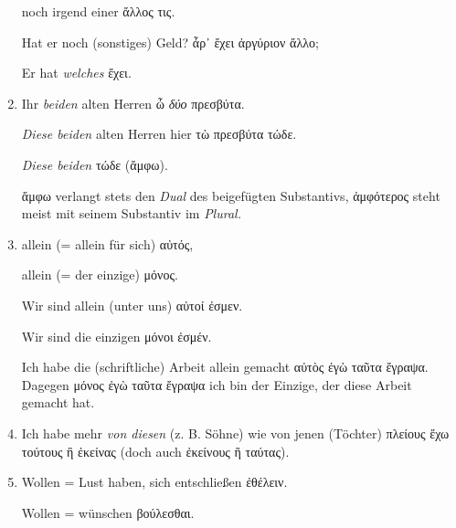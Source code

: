 \begin{enumerate}[leftmargin=0pt,rightmargin=0pt,listparindent =1cm,labelindent=1cm,labelsep=1ex,labelwidth={*},itemindent={*},align=left]
\begin{continuousitemline}
noch irgend einer \textgreek[variant=ancient]{ἄλλος τις.}


Hat er noch (sonstiges) Geld? \textgreek[variant=ancient]{ἆρ᾽ ἔχει
ἀργύριον ἄλλο;}


Er hat \emph{welches} \textgreek[variant=ancient]{ἔχει.}\par\end{continuousitemline}

\item Ihr \emph{beiden} alten Herren \textgreek[variant=ancient]{ὦ \emph{δύο}
πρεσβύτα.}


\begin{continuousitemline}\emph{Diese beiden} alten Herren hier \textgreek[variant=ancient]{τὼ
πρεσβύτα τώδε.}


\emph{Diese beiden} \textgreek[variant=ancient]{τώδε (ἄμφω).}\par\end{continuousitemline}


\textgreek[variant=ancient]{ἄμφω} verlangt stets den \emph{Dual}
des beigefügten Substantivs, \textgreek[variant=ancient]{ἀμφότερος}
steht meist mit seinem Substantiv im \emph{Plural.}

\item allein (= allein für sich) \textgreek[variant=ancient]{αὐτός,}


\begin{continuousitemline}allein (= der einzige) \textgreek[variant=ancient]{μόνος.}


Wir sind allein (unter uns) \textgreek[variant=ancient]{αὐτοί ἐσμεν.}


Wir sind die einzigen \textgreek[variant=ancient]{μόνοι ἐσμέν.}\par\end{continuousitemline}


Ich habe die (schriftliche) Arbeit allein gemacht \textgreek[variant=ancient]{αὐτὸς
ἐγὼ ταῦτα ἔγραψα.} Dagegen \textgreek[variant=ancient]{μόνος ἐγὼ ταῦτα
ἔγραψα} ich bin der Einzige, der diese Arbeit gemacht hat.

\item Ich habe mehr \emph{von diesen} (z. B. Söhne) wie von jenen (Töchter)
\textgreek[variant=ancient]{πλείους ἔχω τούτους ἢ ἐκείνας} (doch auch
\textgreek[variant=ancient]{ἐκείνους ἢ ταύτας}).
\item Wollen = Lust haben, sich entschließen \textgreek[variant=ancient]{ἐθέλειν.}


\begin{continuousitemline}Wollen = wünschen \textgreek[variant=ancient]{βούλεσθαι.}



\end{continuousitemline}
\end{enumerate}

